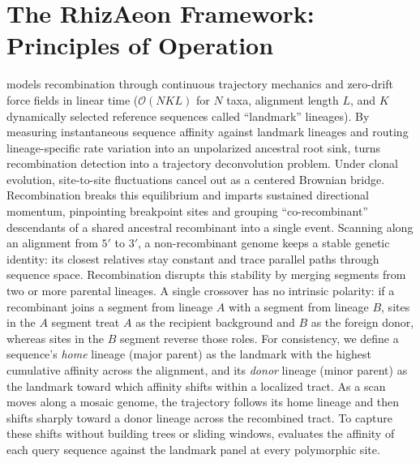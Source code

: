 \section{The RhizAeon Framework: Principles of Operation}
\label{sec:principles_of_operation}

\RhizAeon models recombination through continuous trajectory mechanics and zero-drift force fields in linear time ($\mathcal{O}(N K L)$ for $N$ taxa, alignment length $L$, and $K$ dynamically selected reference sequences called ``landmark'' lineages). By measuring instantaneous sequence affinity against landmark lineages and routing lineage-specific rate variation into an unpolarized ancestral root sink, \RhizAeon turns recombination detection into a trajectory deconvolution problem. Under clonal evolution, site-to-site fluctuations cancel out as a centered Brownian bridge. Recombination breaks this equilibrium and imparts sustained directional momentum, pinpointing breakpoint sites and grouping ``co-recombinant'' descendants of a shared ancestral recombinant into a single event. Scanning along an alignment from $5'$ to $3'$, a non-recombinant genome keeps a stable genetic identity: its closest relatives stay constant and trace parallel paths through sequence space. Recombination disrupts this stability by merging segments from two or more parental lineages. A single crossover has no intrinsic polarity: if a recombinant joins a segment from lineage $A$ with a segment from lineage $B$, sites in the $A$ segment treat $A$ as the recipient background and $B$ as the foreign donor, whereas sites in the $B$ segment reverse those roles. For consistency, we define a sequence's \emph{home} lineage (major parent) as the landmark with the highest cumulative affinity across the alignment, and its \emph{donor} lineage (minor parent) as the landmark toward which affinity shifts within a localized tract. As a scan moves along a mosaic genome, the trajectory follows its home lineage and then shifts sharply toward a donor lineage across the recombined tract. To capture these shifts without building trees or sliding windows, \RhizAeon evaluates the affinity of each query sequence against the landmark panel at every polymorphic site.

